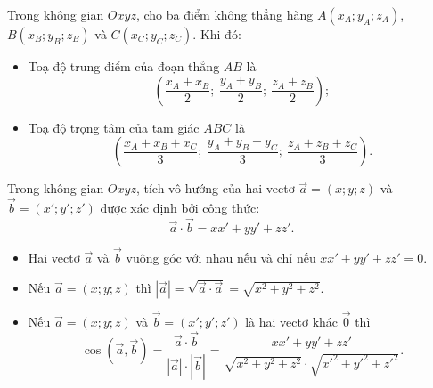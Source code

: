 \begin{congthuc}
\begin{minipage}[c]{.66\linewidth}
Trong không gian $Oxyz$, cho ba điểm không thẳng hàng $A(x_A;y_A;z_A)$, $B(x_B;y_B;z_B)$ và $C(x_C;y_C;z_C)$. Khi đó:
\begin{itemize}
  \item Toạ độ trung điểm của đoạn thẳng $AB$ là
  \[\left(\dfrac{x_A+x_B}{2};\ \dfrac{y_A+y_B}{2};\ \dfrac{z_A+z_B}{2}\right);\]
  \item Toạ độ trọng tâm của tam giác $ABC$ là
  \[\left(\dfrac{x_A+x_B+x_C}{3};\ \dfrac{y_A+y_B+y_C}{3};\ \dfrac{z_A+z_B+z_C}{3}\right).\]
\end{itemize}
\end{minipage}\hfill
\begin{minipage}[c]{.31\linewidth}\centering
{}
\end{minipage}
\end{congthuc}

\begin{congthuc}
Trong không gian $Oxyz$, tích vô hướng của hai vectơ $\vec a=(x;y;z)$ và $\vec b=(x';y';z')$ được xác định bởi công thức:
\[\vec a\cdot\vec b=xx'+yy'+zz'.\]
\end{congthuc}

\begin{nhanxet}
\begin{itemize}
  \item Hai vectơ $\vec a$ và $\vec b$ vuông góc với nhau nếu và chỉ nếu $xx'+yy'+zz'=0$.
  \item Nếu $\vec a=(x;y;z)$ thì $|\vec a|=\sqrt{\vec a\cdot\vec a}=\sqrt{x^2+y^2+z^2}$.
  \item Nếu $\vec a=(x;y;z)$ và $\vec b=(x';y';z')$ là hai vectơ khác $\vec0$ thì
  \[\cos(\vec a,\vec b)=\frac{\vec a\cdot\vec b}{|\vec a|\cdot|\vec b|}=\frac{xx'+yy'+zz'}{\sqrt{x^2+y^2+z^2}\cdot\sqrt{x'^2+y'^2+z'^2}}.\]
\end{itemize}
\end{nhanxet}

